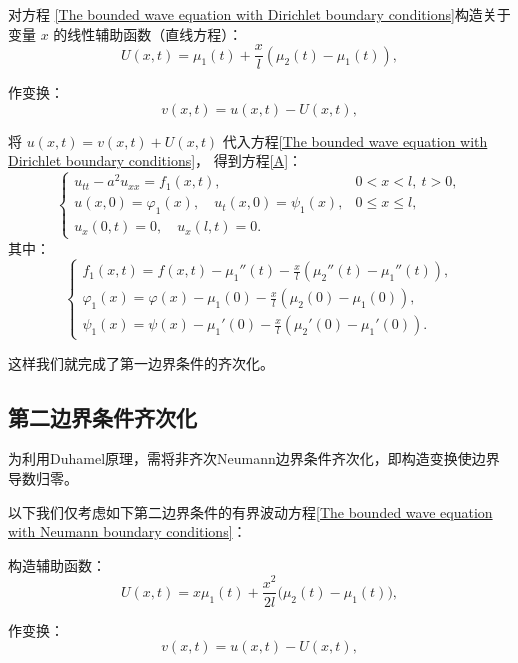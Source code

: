 \documentclass[12pt,a4paper]{article}
\numberwithin{subsection}{section}   %
\numberwithin{subsubsection}{subsection}
\theoremstyle{plain}
\theoremstyle{definition}
\theoremstyle{remark}
\theoremstyle{remark}
\begin{document}
	对方程 \eqref{The bounded wave equation with Dirichlet boundary conditions}构造关于变量 \(x\) 的线性辅助函数（直线方程）：
	\begin{equation}
		U(x, t) = \mu_1(t) + \frac{x}{l}(\mu_2(t) - \mu_1(t)),
	\end{equation}
	
	作变换：
	\begin{equation}
		v(x, t) = u(x, t) - U(x, t),
	\end{equation}
	
	将 \(u(x, t) = v(x, t) + U(x, t)\) 代入方程\eqref{The bounded wave equation with Dirichlet boundary conditions}，
	得到方程\eqref{A}：
	\begin{equation}\label{A}
	\begin{cases}
		u_{tt} - a^2 u_{xx} = f_1(x, t), & 0 < x < l, \ t > 0, \\
		u(x, 0) = \varphi_1(x), \quad u_t(x, 0) = \psi_1(x), & 0 \leq x \leq l, \\
		u_x(0, t) = 0, \quad u_x(l, t) = 0. &
	\end{cases}
\end{equation}
	其中：
	\begin{equation}
		\begin{cases}
			f_1(x, t) = f(x, t) - \mu_1''(t) - \frac{x}{l}(\mu_2''(t) - \mu_1''(t)), \\
			\varphi_1(x) = \varphi(x) - \mu_1(0) - \frac{x}{l}(\mu_2(0) - \mu_1(0)), \\
			\psi_1(x) = \psi(x) - \mu_1'(0) - \frac{x}{l}(\mu_2'(0) - \mu_1'(0)).
		\end{cases}
	\end{equation}
	
	这样我们就完成了第一边界条件的齐次化。
	
	\subsection{第二边界条件齐次化}
	为利用Duhamel原理，需将非齐次Neumann边界条件齐次化，即构造变换使边界导数归零。

		
		以下我们仅考虑如下第二边界条件的有界波动方程\eqref{The bounded wave equation with Neumann boundary conditions}：
		
		构造辅助函数：
		\begin{equation}
			U(x, t) = x\mu_1(t) + \frac{x^2}{2l}\big( \mu_2(t) - \mu_1(t) \big),
		\end{equation}
		
		作变换：
		\begin{equation}
			v(x, t) = u(x, t) - U(x, t),
		\end{equation}
		
\end{document}
